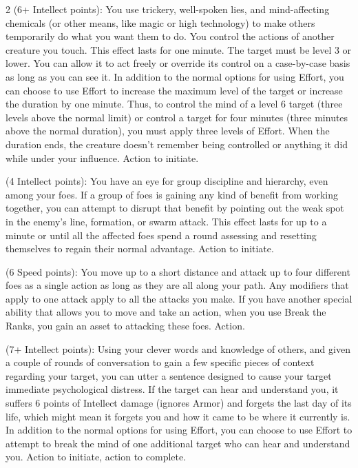 \begin{multicols}{2}
 (6+ Intellect points): You use trickery, well-spoken lies, and mind-affecting chemicals (or other means, like magic or high technology) to make others temporarily do what you want them to do. You control the actions of another creature you touch. This effect lasts for one minute. The target must be level 3 or lower. You can allow it to act freely or override its control on a case-by-case basis as long as you can see it. In addition to the normal options for using Effort, you can choose to use Effort to increase the maximum level of the target or increase the duration by one minute. Thus, to control the mind of a level 6 target (three levels above the normal limit) or control a target for four minutes (three minutes above the normal duration), you must apply three levels of Effort. When the duration ends, the creature doesn’t remember being controlled or anything it did while under your influence. Action to initiate. 

 (4 Intellect points): You have an eye for group discipline and hierarchy, even among your foes. If a group of foes is gaining any kind of benefit from working together, you can attempt to disrupt that benefit by pointing out the weak spot in the enemy’s line, formation, or swarm attack. This effect lasts for up to a minute or until all the affected foes spend a round assessing and resetting themselves to regain their normal advantage. Action to initiate. 

 (6 Speed points): You move up to a short distance and attack up to four different foes as a single action as long as they are all along your path. Any modifiers that apply to one attack apply to all the attacks you make. If you have another special ability that allows you to move and take an action, when you use Break the Ranks, you gain an asset to attacking these foes. Action. 

 (7+ Intellect points): Using your clever words and knowledge of others, and given a couple of rounds of conversation to gain a few specific pieces of context regarding your target, you can utter a sentence designed to cause your target immediate psychological distress. If the target can hear and understand you, it suffers 6 points of Intellect damage (ignores Armor) and forgets the last day of its life, which might mean it forgets you and how it came to be where it currently is. In addition to the normal options for using Effort, you can choose to use Effort to attempt to break the mind of one additional target who can hear and understand you. Action to initiate, action to complete. 


\end{multicols}
